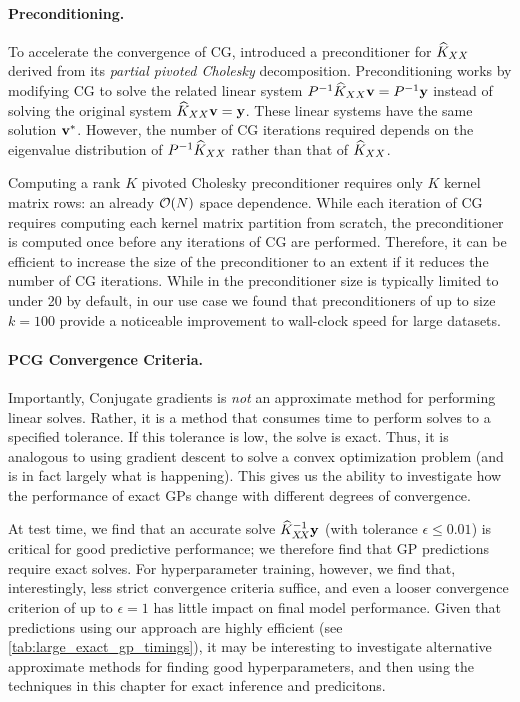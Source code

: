 \paragraph{Preconditioning.}
To accelerate the convergence of CG, \citet{gardner2018gpytorch} introduced a preconditioner for $\widehat{K}_{XX}$ derived from its \emph{partial pivoted Cholesky} decomposition. Preconditioning works by modifying CG to solve the related linear system $P^{-1} \widehat{K}_{XX} \mathbf{v} = P^{-1}\mathbf{y}$
instead of solving the original system $\widehat{K}_{XX} \mathbf{v} = \mathbf{y}$. These
linear systems have the same solution $\mathbf{v}^{*}$. However, the number of CG iterations required depends on the
eigenvalue distribution of $P^{-1}\widehat{K}_{XX}$ rather than that of $\widehat{K}_{XX}$.

Computing a rank $K$ pivoted Cholesky preconditioner requires only $K$ kernel matrix rows:
an already $\bigo{N}$ space dependence. While each iteration of CG requires computing each kernel matrix partition
from scratch, the preconditioner is computed once before any iterations of CG are performed. Therefore, it can be efficient to increase the size of the preconditioner to an extent if it reduces the number of CG iterations.
While in \citet{gardner2018gpytorch} the preconditioner size is typically limited to under 20 by default, in our use
case we found that preconditioners of up to size $k=100$ provide a noticeable improvement to wall-clock speed for large datasets.

\paragraph{PCG Convergence Criteria.}
Importantly, Conjugate gradients is \emph{not} an approximate method for performing linear solves. Rather, it is a method that consumes time to perform solves to a specified tolerance. If this tolerance is low, the solve is exact. Thus, it is analogous to using gradient descent to solve a convex optimization problem (and is in fact largely what is happening). This gives us the ability to investigate how the performance of exact GPs change with different degrees of convergence.

At test time, we find that an accurate solve $\widehat {K}_{X \! X}^{-1} \mathbf{y}$ (with tolerance $\epsilon \leq 0.01$) is critical for good predictive performance; we therefore find that GP predictions require exact solves. For hyperparameter training, however, we find that, interestingly, less strict convergence criteria suffice, and even a looser convergence criterion of up to $\epsilon = 1$ has little impact on final model performance.
Given that predictions using our approach are highly efficient (see \cref{tab:large_exact_gp_timings}), it may be interesting to investigate alternative approximate methods for finding good hyperparameters, and then using the techniques in this chapter for exact inference and predicitons.
